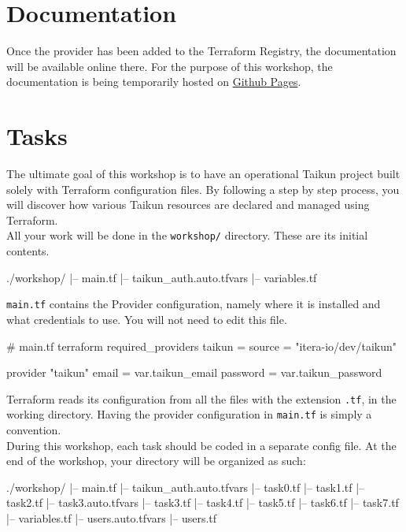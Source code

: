 \section{Documentation}
Once the provider has been added to the Terraform Registry, the documentation will be available online there.
For the purpose of this workshop, the documentation is being temporarily hosted on \href{https://intuinewin.github.io/taikun-docs/}{Github Pages}.

\section{Tasks}
The ultimate goal of this workshop is to have an operational Taikun project built solely with Terraform
configuration files.
By following a step by step process, you will discover how various Taikun
resources are declared and managed using Terraform.\\

All your work will be done in the \texttt{workshop/} directory. These are its initial contents.
\begin{raw}
./workshop/
|-- main.tf
|-- taikun_auth.auto.tfvars
|-- variables.tf
\end{raw}
\texttt{main.tf} contains the Provider configuration, namely where it is installed
and what credentials to use. You will not need to edit this file.
\begin{tf}
# main.tf
terraform {
  required_providers {
    taikun = {
      source = "itera-io/dev/taikun"
    }
  }
}

provider "taikun" {
  email    = var.taikun_email
  password = var.taikun_password
}
\end{tf}
Terraform reads its configuration from all the files with the extension \texttt{.tf},
in the working directory.
Having the provider configuration in \texttt{main.tf} is simply a convention.\\

During this workshop, each task should be coded in a separate config file.
At the end of the workshop, your directory will be organized as such:
\begin{raw}
./workshop/
|-- main.tf
|-- taikun_auth.auto.tfvars
|-- task0.tf
|-- task1.tf
|-- task2.tf
|-- task3.auto.tfvars
|-- task3.tf
|-- task4.tf
|-- task5.tf
|-- task6.tf
|-- task7.tf
|-- variables.tf
|-- users.auto.tfvars
|-- users.tf
\end{raw}

